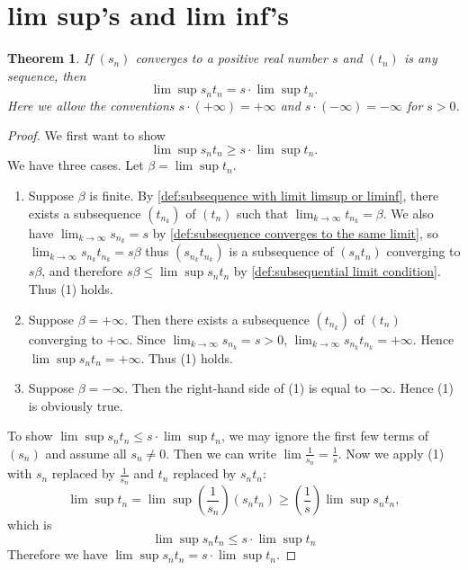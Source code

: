 \documentclass[12pt, lettersize]{book}
\newtheorem{thm}{Theorem}[section]
\begin{document}
	\section{lim sup's and lim inf's}
		\setcounter{equation}{0}
		\begin{thm}\label{thm:12.1}
		If $(s_n)$ converges to a positive real number $s$ and $(t_n)$ is any sequence, then
		\begin{displaymath}
			\lim\sup s_nt_n=s\cdot\lim\sup t_n.
		\end{displaymath}
		Here we allow the conventions $s\cdot(+\infty)=+\infty$ and $s\cdot(-\infty)=-\infty$ for $s>0$.
		\end{thm}
		\begin{proof}
		We first want to show
		\begin{equation}
			\lim\sup s_nt_n\geq s\cdot\lim\sup t_n.
		\end{equation}
		We have three cases. Let $\beta=\lim\sup t_n$.
		\begin{enumerate}
			\item Suppose $\beta$ is finite. By \ref{def:subsequence with limit limsup or liminf}, there exists a subsequence
			$(t_{n_k})$ of $(t_n)$ such that $\lim_{k\rightarrow\infty}t_{n_k}=\beta$. We also have $\lim_{k\rightarrow\infty}s_{n_k}=s$ by \ref{def:subsequence converges to the same limit}, so $\lim_{k\rightarrow\infty}s_{n_k}t_{n_k}=s\beta$ thus $(s_{n_k}t_{n_k})$ is a subsequence of $(s_nt_n)$ converging to $s\beta$, and therefore $s\beta\leq\lim\sup s_nt_n$ by \ref{def:subsequential limit condition}. Thus (1) holds.
			\item Suppose $\beta=+\infty$. Then there exists a subsequence $(t_{n_k})$ of $(t_n)$ converging to $+\infty$.
			Since $\lim_{k\rightarrow\infty}s_{n_k}=s>0$, $\lim_{k\rightarrow\infty}s_{n_k}t_{n_k}=+\infty$. Hence $\lim\sup s_nt_n=+\infty$. Thus (1) holds.
			\item Suppose $\beta=-\infty$. Then the right-hand side of (1) is equal to $-\infty$. Hence (1) is obviously true.	
		\end{enumerate}
		To show $\lim\sup s_nt_n\leq s\cdot\lim\sup t_n$, we may ignore the first few terms of $(s_n)$ and assume all $s_n\neq0$. Then we can write $\lim\frac{1}{s_n}=\frac{1}{s}$. Now we apply (1) with $s_n$ replaced by $\frac{1}{s_n}$ and $t_n$ replaced by $s_nt_n$:
		\begin{displaymath}
			\lim\sup t_n=\lim\sup(\frac{1}{s_n})(s_nt_n)\geq(\frac{1}{s})\lim\sup s_nt_n,
		\end{displaymath}
		which is 
		\begin{displaymath}
			\lim\sup s_nt_n\leq s\cdot\lim\sup t_n
		\end{displaymath}
		Therefore we have $\lim\sup s_nt_n=s\cdot\lim\sup t_n$.
		\end{proof}
		
\end{document}
